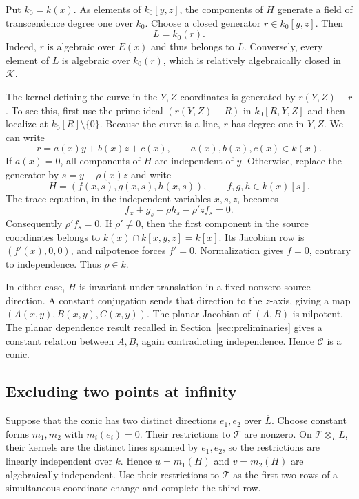 Put $k_0=k(x)$. As elements of $k_0[y,z]$, the components of $H$ generate a field of transcendence degree one over $k_0$. Choose a closed generator $r\in k_0[y,z]$. Then
\begin{equation}\label{eq:line-field}
 L=k_0(r).
\end{equation}
Indeed, $r$ is algebraic over $E(x)$ and thus belongs to $L$. Conversely, every element of $L$ is algebraic over $k_0(r)$, which is relatively algebraically closed in $\mathcal K$.

The kernel defining the curve in the $Y,Z$ coordinates is generated by $r(Y,Z)-r$. To see this, first use the prime ideal $(r(Y,Z)-R)$ in $k_0[R,Y,Z]$ and then localize at $k_0[R]\setminus\{0\}$. Because the curve is a line, $r$ has degree one in $Y,Z$. We can write
\[
 r=a(x)y+b(x)z+c(x),\qquad a(x),b(x),c(x)\in k(x).
\]
If $a(x)=0$, all components of $H$ are independent of $y$. Otherwise, replace the generator by $s=y-\rho(x)z$ and write
\[
 H=(f(x,s),g(x,s),h(x,s)),\qquad f,g,h\in k(x)[s].
\]
The trace equation, in the independent variables $x,s,z$, becomes
\[
 f_x+g_s-\rho h_s-\rho' zf_s=0.
\]
Consequently $\rho'f_s=0$. If $\rho'\neq0$, then the first component in the source coordinates belongs to $k(x)\cap k[x,y,z]=k[x]$. Its Jacobian row is $(f'(x),0,0)$, and nilpotence forces $f'=0$. Normalization gives $f=0$, contrary to independence. Thus $\rho\in k$.

In either case, $H$ is invariant under translation in a fixed nonzero source direction. A constant conjugation sends that direction to the $z$-axis, giving a map $(A(x,y),B(x,y),C(x,y))$. The planar Jacobian of $(A,B)$ is nilpotent. The planar dependence result recalled in Section~\ref{sec:preliminaries} gives a constant relation between $A,B$, again contradicting independence. Hence $\mathcal C$ is a conic.

\subsection{Excluding two points at infinity}
Suppose that the conic has two distinct directions $e_1,e_2$ over $\overline L$. Choose constant forms $m_1,m_2$ with $m_i(e_i)=0$. Their restrictions to $\mathcal T$ are nonzero. On $\mathcal T\otimes_L\overline L$, their kernels are the distinct lines spanned by $e_1,e_2$, so the restrictions are linearly independent over $k$. Hence $u=m_1(H)$ and $v=m_2(H)$ are algebraically independent. Use their restrictions to $\mathcal T$ as the first two rows of a simultaneous coordinate change and complete the third row.


